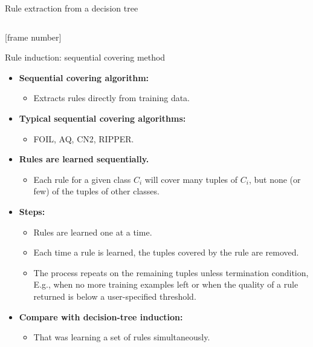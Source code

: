 \documentclass[aspectratio=169,t,table]{beamer}
\begin{document}
{\begin{frame}{Rule extraction from a decision tree}
\begin{columns}
\begin{column}{0.55\textwidth}
        \end{column}
      \end{columns}
    \end{frame}
  }

  {
    [frame number]
    \begin{frame}{Rule induction: sequential covering method}
      \begin{itemize}
        \item \textbf{Sequential covering algorithm:}
        \begin{itemize}
          \item Extracts rules directly from training data.
        \end{itemize}
        \item \textbf{Typical sequential covering algorithms:}
        \begin{itemize}
          \item FOIL, AQ, CN2, RIPPER.
        \end{itemize}
        \item \textbf{Rules are learned {\color{airforceblue}sequentially}.}
        \begin{itemize}
          \item Each rule for a given class $C_i$ will cover many tuples of $C_i$, but none (or few) of the tuples of other classes.
        \end{itemize}
        \item \textbf{Steps:}
        \begin{itemize}
          \item Rules are learned one at a time.
          \item Each time a rule is learned, the tuples covered by the rule are removed.
          \item The process repeats on the remaining tuples unless termination condition, E.g., when no more training examples left or when the quality of a rule returned is below a user-specified threshold.
        \end{itemize}
        \item \textbf{Compare with decision-tree induction:}
        \begin{itemize}
          \item That was learning a set of rules simultaneously.
        \end{itemize}
      \end{itemize}
    \end{frame}
  }
\end{document}
